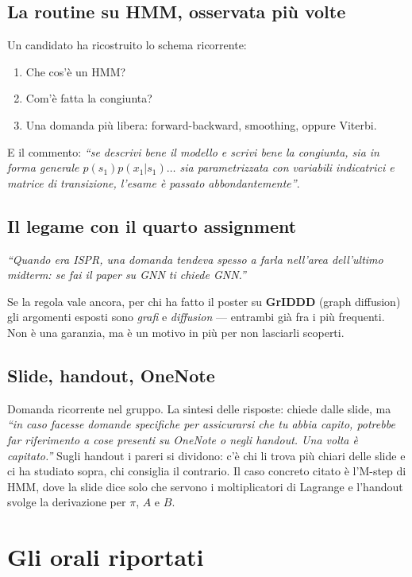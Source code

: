 \subsection*{La routine su HMM, osservata più volte}

Un candidato ha ricostruito lo schema ricorrente:
\begin{enumerate}[leftmargin=2em]
  \item Che cos'è un HMM?
  \item Com'è fatta la congiunta?
  \item Una domanda più libera: forward-backward, smoothing, oppure Viterbi.
\end{enumerate}
E il commento: \emph{``se descrivi bene il modello e scrivi bene la congiunta, sia in forma generale $p(s_1)p(x_1|s_1)\dots$ sia parametrizzata con variabili indicatrici e matrice di transizione, l'esame è passato abbondantemente''}.

\subsection*{Il legame con il quarto assignment}

\emph{``Quando era ISPR, una domanda tendeva spesso a farla nell'area dell'ultimo midterm: se fai il paper su GNN ti chiede GNN.''}

Se la regola vale ancora, per chi ha fatto il poster su \textbf{GrIDDD} (graph diffusion) gli argomenti esposti sono \emph{grafi} e \emph{diffusion} — entrambi già fra i più frequenti. Non è una garanzia, ma è un motivo in più per non lasciarli scoperti.

\subsection*{Slide, handout, OneNote}

Domanda ricorrente nel gruppo. La sintesi delle risposte: chiede dalle slide, ma \emph{``in caso facesse domande specifiche per assicurarsi che tu abbia capito, potrebbe far riferimento a cose presenti su OneNote o negli handout. Una volta è capitato.''} Sugli handout i pareri si dividono: c'è chi li trova più chiari delle slide e ci ha studiato sopra, chi consiglia il contrario. Il caso concreto citato è l'M-step di HMM, dove la slide dice solo che servono i moltiplicatori di Lagrange e l'handout svolge la derivazione per $\pi$, $A$ e $B$.

\section{Gli orali riportati}

